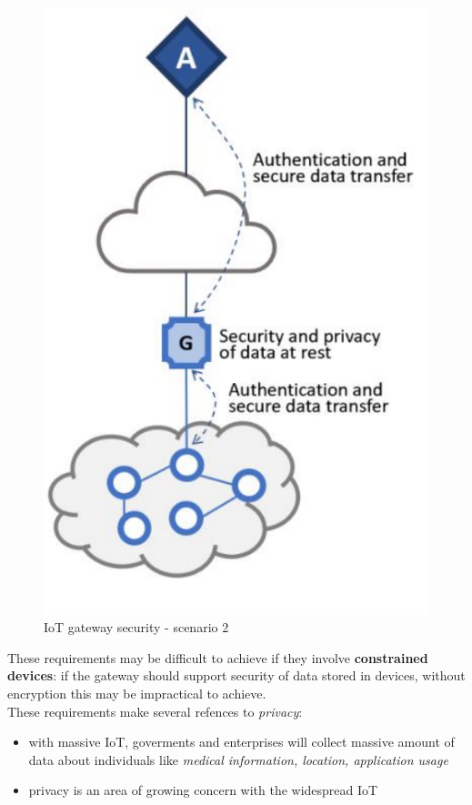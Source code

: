 \documentclass[10pt,a4paper]{report}
\theoremstyle{definition}
\begin{document}
\begin{figure}[h]
	\centering
	\includegraphics[scale=0.30]{images/Pasted image 20230529150410.png}
	\caption{IoT gateway security - scenario 2}
	\label{security-scenario2}
\end{figure}

These requirements may be difficult to achieve if they involve \textbf{constrained devices}: if the gateway should support security of data stored in devices, without encryption this may be impractical to achieve.\\
These requirements make several refences to \textit{privacy}:
\begin{itemize}
	\item with massive IoT, goverments and enterprises will collect massive amount of data about individuals like \textit{medical information, location, application usage}
	\item privacy is an area of growing concern with the widespread IoT
	
\end{itemize}
\end{document}
